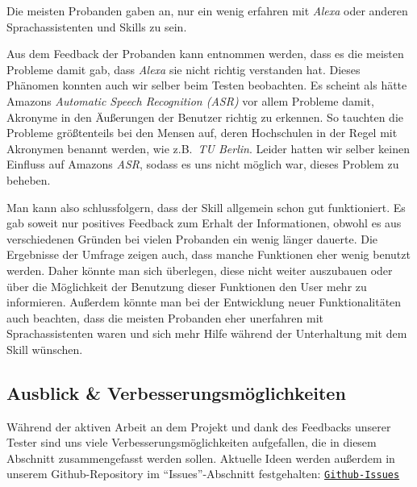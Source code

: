 \documentclass[12pt]{article}
\begin{document}
Die meisten Probanden gaben an, nur ein wenig erfahren mit \emph{Alexa} oder anderen Sprachassistenten und Skills zu sein.

Aus dem Feedback der Probanden kann entnommen werden, dass es die meisten Probleme damit gab, dass \emph{Alexa} sie nicht richtig verstanden hat.
Dieses Phänomen konnten auch wir selber beim Testen beobachten.
Es scheint als hätte Amazons \emph{Automatic Speech Recognition (ASR)} vor allem Probleme damit, Akronyme in den Äußerungen der Benutzer richtig zu erkennen.
So tauchten die Probleme größtenteils bei den Mensen auf, deren Hochschulen in der Regel mit Akronymen benannt werden, wie z.B.~\emph{TU Berlin}.
Leider hatten wir selber keinen Einfluss auf Amazons \emph{ASR}, sodass es uns nicht möglich war, dieses Problem zu beheben.

Man kann also schlussfolgern, dass der Skill allgemein schon gut funktioniert.
Es gab soweit nur positives Feedback zum Erhalt der Informationen, obwohl es aus verschiedenen Gründen bei vielen Probanden ein wenig länger dauerte.
Die Ergebnisse der Umfrage zeigen auch, dass manche Funktionen eher wenig benutzt werden.
Daher könnte man sich überlegen, diese nicht weiter auszubauen oder über die Möglichkeit der Benutzung dieser Funktionen den User mehr zu informieren.
Außerdem könnte man bei der Entwicklung neuer Funktionalitäten auch beachten, dass die meisten Probanden eher unerfahren mit Sprachassistenten waren und sich mehr Hilfe während der Unterhaltung mit dem Skill wünschen.

\newpage
\subsection{Ausblick \& Verbesserungsmöglichkeiten}

Während der aktiven Arbeit an dem Projekt und dank des Feedbacks unserer Tester sind uns viele Verbesserungsmöglichkeiten aufgefallen, die in diesem Abschnitt zusammengefasst werden sollen.
Aktuelle Ideen werden außerdem in unserem Github-Repository im “Issues”-Abschnitt festgehalten: \href{https://github.com/mmonimon/mensa-skill/issues}{\texttt{Github-Issues}}
\end{document}

